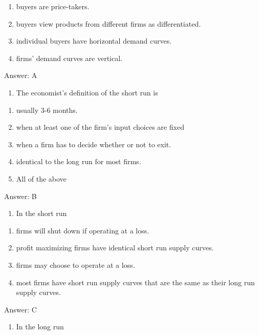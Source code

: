 \documentclass[11pt,]{article}
\providecommand{\tightlist}{%
  \setlength{\itemsep}{0pt}\setlength{\parskip}{0pt}}
\begin{document}
\begin{enumerate}
\def\labelenumi{\Alph{enumi})}
\tightlist
\item
  buyers are price-takers.
\item
  buyers view products from different firms as differentiated.
\item
  individual buyers have horizontal demand curves.
\item
  firms' demand curves are vertical.
\end{enumerate}

Answer: A

\begin{enumerate}
\def\labelenumi{\arabic{enumi})}
\setcounter{enumi}{14}
\tightlist
\item
  The economist's definition of the short run is
\end{enumerate}

\begin{enumerate}
\def\labelenumi{\Alph{enumi})}
\tightlist
\item
  usually 3-6 months.
\item
  when at least one of the firm's input choices are fixed
\item
  when a firm has to decide whether or not to exit.
\item
  identical to the long run for most firms.
\item
  All of the above
\end{enumerate}

Answer: B

\begin{enumerate}
\def\labelenumi{\arabic{enumi})}
\setcounter{enumi}{15}
\tightlist
\item
  In the short run
\end{enumerate}

\begin{enumerate}
\def\labelenumi{\Alph{enumi})}
\tightlist
\item
  firms will shut down if operating at a loss.
\item
  profit maximizing firms have identical short run supply curves.
\item
  firms may choose to operate at a loss.
\item
  most firms have short run supply curves that are the same as their
  long run supply curves.
\end{enumerate}

Answer: C

\begin{enumerate}
\def\labelenumi{\arabic{enumi})}
\setcounter{enumi}{15}
\tightlist
\item
  In the long run
\end{enumerate}
\end{document}
